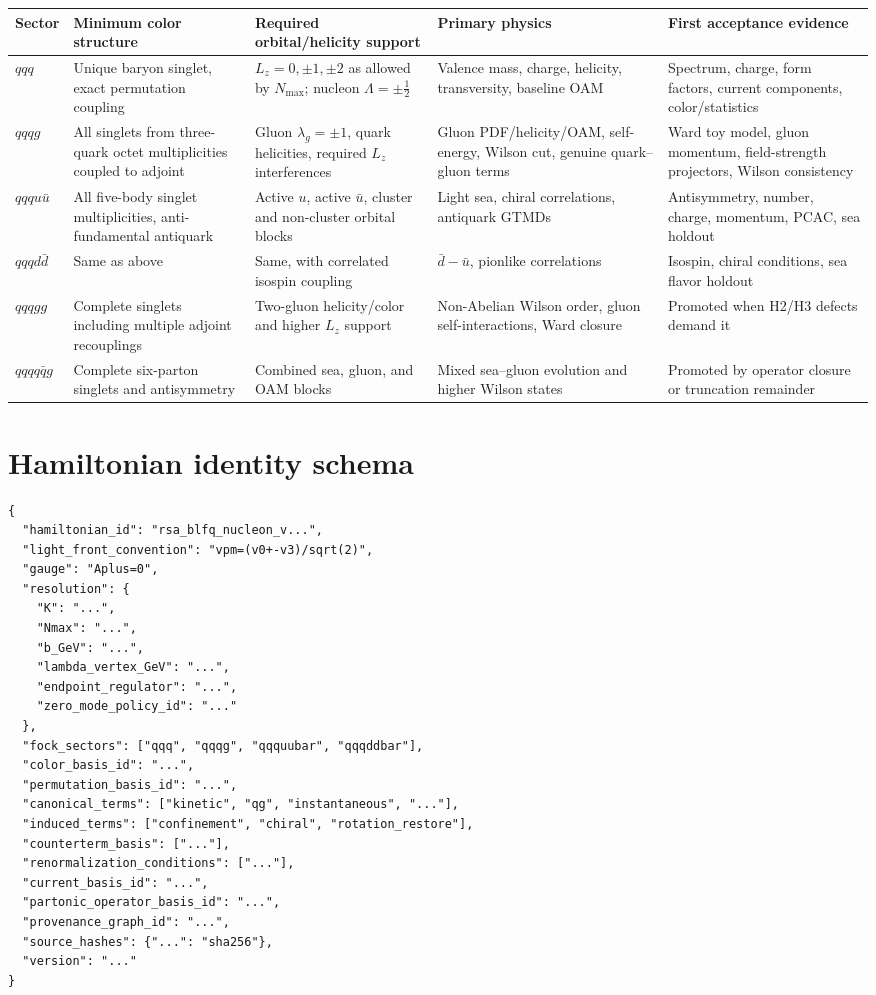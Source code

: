 \documentclass[11pt]{article}
\newcommand{\Lz}{L_z}
\begin{document}
\begingroup
\setlength{\tabcolsep}{3pt}
\begin{longtable}{L{0.11\textwidth}L{0.16\textwidth}L{0.19\textwidth}L{0.20\textwidth}L{0.18\textwidth}}
\toprule
Sector & Minimum color structure & Required orbital/helicity support & Primary physics & First acceptance evidence\\
\midrule
\endhead
\(qqq\) & Unique baryon singlet, exact permutation coupling &
\(\Lz=0,\pm1,\pm2\) as allowed by \(N_{\max}\); nucleon
\(\Lambda=\pm\frac12\) & Valence mass, charge, helicity, transversity,
baseline OAM & Spectrum, charge, form factors, current components,
color/statistics\\
\(qqqg\) & All singlets from three-quark octet multiplicities coupled to
adjoint & Gluon \(\lambda_g=\pm1\), quark helicities, required \(\Lz\)
interferences & Gluon PDF/helicity/OAM, self-energy, Wilson cut, genuine
quark--gluon terms & Ward toy model, gluon momentum, field-strength projectors,
Wilson consistency\\
\(qqqu\bar u\) & All five-body singlet multiplicities, anti-fundamental
antiquark & Active \(u\), active \(\bar u\), cluster and non-cluster orbital
blocks & Light sea, chiral correlations, antiquark GTMDs & Antisymmetry, number,
charge, momentum, PCAC, sea holdout\\
\(qqqd\bar d\) & Same as above & Same, with correlated isospin coupling &
\(\bar d-\bar u\), pionlike correlations & Isospin, chiral conditions, sea
flavor holdout\\
\(qqqgg\) & Complete singlets including multiple adjoint recouplings &
Two-gluon helicity/color and higher \(\Lz\) support & Non-Abelian Wilson order,
gluon self-interactions, Ward closure & Promoted when H2/H3 defects demand it\\
\(qqqq\bar qg\) & Complete six-parton singlets and antisymmetry & Combined sea,
gluon, and OAM blocks & Mixed sea--gluon evolution and higher Wilson states &
Promoted by operator closure or truncation remainder\\
\bottomrule
\end{longtable}
\endgroup

\section{Hamiltonian identity schema}
\label{app:ham-schema}

\begin{verbatim}
{
  "hamiltonian_id": "rsa_blfq_nucleon_v...",
  "light_front_convention": "vpm=(v0+-v3)/sqrt(2)",
  "gauge": "Aplus=0",
  "resolution": {
    "K": "...",
    "Nmax": "...",
    "b_GeV": "...",
    "lambda_vertex_GeV": "...",
    "endpoint_regulator": "...",
    "zero_mode_policy_id": "..."
  },
  "fock_sectors": ["qqq", "qqqg", "qqquubar", "qqqddbar"],
  "color_basis_id": "...",
  "permutation_basis_id": "...",
  "canonical_terms": ["kinetic", "qg", "instantaneous", "..."],
  "induced_terms": ["confinement", "chiral", "rotation_restore"],
  "counterterm_basis": ["..."],
  "renormalization_conditions": ["..."],
  "current_basis_id": "...",
  "partonic_operator_basis_id": "...",
  "provenance_graph_id": "...",
  "source_hashes": {"...": "sha256"},
  "version": "..."
}
\end{verbatim}
\end{document}
